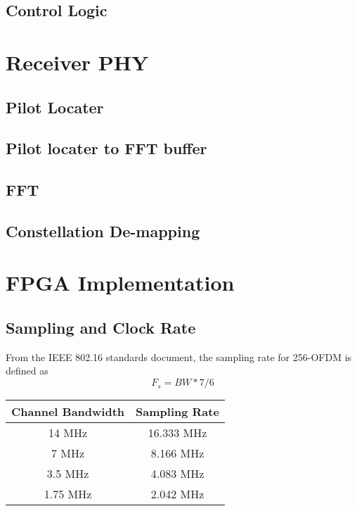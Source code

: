 \documentclass[10pt]{article}
\begin{document}
	\subsection{Control Logic}
	\label{sec:ctrl}

\section{Receiver PHY}
	\subsection{Pilot Locater}

	\subsection{Pilot locater to FFT buffer}

	\subsection{FFT}

	\subsection{Constellation De-mapping}
	
\section{FPGA Implementation}
  \subsection{Sampling and Clock Rate}
    From the IEEE 802.16 standards document, the sampling rate for 256-OFDM is defined as
    \begin{equation}
    F_s = BW * 7/6
    \end{equation}
  
  \begin{center}
  \begin{tabular}{|c|c|}
  Channel Bandwidth & Sampling Rate \\ \hline
  14 MHz & 16.333 MHz \\
  7 MHz & 8.166 MHz \\
  3.5 MHz & 4.083 MHz \\
  1.75 MHz & 2.042 MHz \\ \hline
  \end{tabular}
  \end{center}
  
\end{document}
